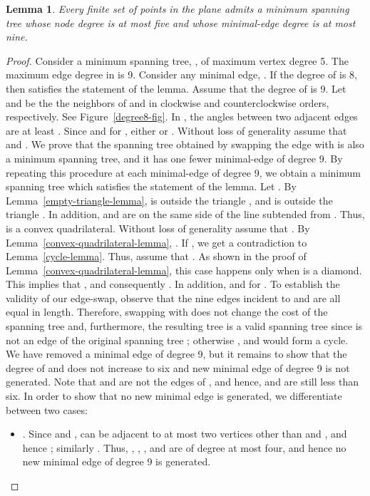 \documentclass[11pt,a4paper]{article}
\newtheorem{lemma}{Lemma}
\begin{document}
\begin{lemma} 
\label{edge-degree-lemma}
Every finite set of points  in the plane admits a minimum spanning tree whose node degree is at most five and whose minimal-edge degree is at most nine.
\end{lemma}
\begin{proof}
Consider a minimum spanning tree, , of maximum vertex degree 5. The maximum edge degree in  is 9. Consider any minimal edge, . If the degree of  is 8, then  satisfies the statement of the lemma. Assume that the degree of  is 9. Let  and  be the the neighbors of  and  in clockwise and counterclockwise orders, respectively. See Figure~\ref{degree8-fig}. In , the angles between two adjacent edges are at least . Since  and  for , either  or . Without loss of generality assume that  and . We prove that the spanning tree
obtained by swapping the edge  with  is also a minimum spanning tree, and it has one fewer minimal-edge of degree 9. By repeating this procedure at each minimal-edge of degree 9, we obtain a minimum spanning tree which satisfies the statement of the lemma. 
Let . By Lemma~\ref{empty-triangle-lemma},  is outside the triangle , and  is outside the triangle . In addition,  and  are on the same side of the line subtended from . Thus,  is a convex quadrilateral.
Without loss of generality assume that . By Lemma~\ref{convex-quadrilateral-lemma}, . If , we get a contradiction to Lemma~\ref{cycle-lemma}. Thus, assume that . As shown in the proof of Lemma~\ref{convex-quadrilateral-lemma}, this case happens only when  is a diamond. This implies that , and consequently . In addition,  and  for . To establish the validity of our edge-swap, observe that the nine edges incident to  and  are all equal in length. Therefore, swapping  with  does not change the cost of the spanning tree and, furthermore, the resulting tree is a valid spanning tree
since  is not an edge of the original spanning tree ; otherwise , and  would form a cycle. We have removed a minimal edge  of degree 9, but it remains to show that the degree of  and  does not increase to six and new minimal edge of degree 9 is not generated. Note that  and  are not the edges of , and hence,  and  are still less than six. In order to show that no new minimal edge is generated, we differentiate between two cases:

\begin{itemize}
 \item . Since  and ,  can be adjacent to at most two vertices other than  and , and hence ; similarly . Thus, , , , and  are of degree at most four, and hence no new minimal edge of degree 9 is generated.


\end{itemize}
\end{proof}
\end{document}
